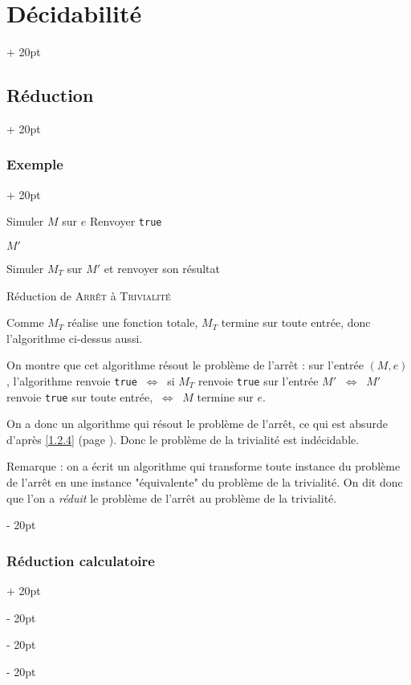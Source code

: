 \documentclass[a4paper, 12pt, twoside]{article}
\newcommand{\ssi}{\ \Leftrightarrow \ }
\newcommand{\ind}[1][20pt]{\advance\leftskip + #1}
\newcommand{\deind}[1][20pt]{\advance\leftskip - #1}
\newenvironment{indt}[2][20pt]{#2 \par \ind[#1]}{\par \deind} %
\begin{document}
\begin{indt}{\section{Décidabilité}}
\begin{indt}{\subsection{Réduction}}
\begin{indt}{\subsubsection{Exemple}}
\begin{algoBox}
\begin{algorithm}[H]
\begin{algorithm}[H]
                            \BlankLine

                            Simuler $M$ sur $e$\;
                            Renvoyer \texttt{true}\;

                            \caption{$M'$}
                        \end{algorithm}
                    
                        \BlankLine
                    
                        Simuler $M_T$ sur $M'$ et renvoyer son résultat\;

                        \setcounter{algocf}{2}
                        \caption{Réduction de \textsc{Arrêt} à \textsc{Trivialité}}
                    \end{algorithm}
                \end{algoBox}

                \setcounter{algocf}{4}

                Comme $M_T$ réalise une fonction totale, $M_T$ termine sur toute entrée, donc l'algorithme ci-dessus aussi.

                On montre que cet algorithme résout le problème de l'arrêt : sur l'entrée $(M, e)$, l'algorithme renvoie \texttt{true}
                $\ssi$ si $M_T$ renvoie \texttt{true} sur l'entrée $M'$
                $\ssi$ $M'$ renvoie \texttt{true} sur toute entrée,
                $\ssi$ $M$ termine sur $e$.

                On a donc un algorithme qui résout le problème de l'arrêt, ce qui est absurde d'après \ref{1.2.4} (page \pageref{1.2.4}).
                Donc le problème de la trivialité est indécidable.

                \vspace{12pt}
                
                Remarque : on a écrit un algorithme qui transforme toute instance du problème de l'arrêt en une instance "équivalente" du problème de la trivialité.
                On dit donc que l'on a \emph{réduit} le problème de l'arrêt au problème de la trivialité.
            \end{indt}

            \vspace{12pt}
            
            \begin{indt}{\subsubsection{Réduction calculatoire}}
                \label{1.3.3}


\end{indt}
\end{indt}
\end{indt}
\end{document}
